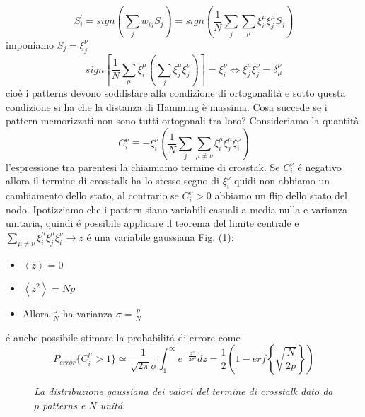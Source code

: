 \documentclass[12pt, a4paper]{book}
\theoremstyle{theorem}
\begin{document}
				\begin{equation}
					S_{i}^\prime = sign \left( \sum_{j}w_{ij} S_{j} \right)= sign \left( \frac{1}{N}\sum_{j} \sum_{\mu}\xi_{i}^{\mu}\xi_{j}^{\mu}S_{j} \right)
				\end{equation} %
				imponiamo $S_j = \xi_j^\nu$
				\begin{equation}
					sign\left[ \frac{1}{N}\sum_\mu \xi_i^\mu \left( \sum_j \xi_j^\mu \xi_j^\nu\right) \right] = \xi_i^\nu \Longleftrightarrow \xi_j^\mu \xi_j^\nu = \delta_\mu^\nu
				\end{equation} 
				cioè i patterns devono soddisfare alla condizione di ortogonalità e sotto questa condizione si ha che la distanza di Hamming è massima.
				Cosa succede se i pattern memorizzati non sono tutti ortogonali tra loro?
				Consideriamo la quantità
				\begin{equation}
					C_i^\nu \equiv -\xi^\nu_i \left( \frac{1}{N} \sum_j \sum_{\mu \neq \nu} \xi_i^\mu \xi_j^\mu \xi_i^\nu \right)
				\end{equation}
				l'espressione tra parentesi la chiamiamo termine di crosstak. Se $C_i^\nu$ \'e negativo allora il termine di crosstalk ha lo stesso segno di $\xi^\nu_i$ quidi non abbiamo un cambiamento dello stato, al contrario se $C_i^\nu>0$ abbiamo un flip dello stato del nodo. Ipotizziamo che i pattern siano variabili casuali a media nulla e varianza  unitaria, quindi \'e possibile applicare il teorema del limite centrale e $\sum_{\mu \neq \nu} \xi_i^\mu \xi_j^\mu \xi_i^\nu \rightarrow z$ \'e una variabile gaussiana Fig. (\ref{figure::gauss_hopfield}):
				\begin{itemize}
					\item $\left \langle z \right \rangle =0$
					\item $\left \langle z^2 \right \rangle =Np$
					\item Allora $\frac{z}{N}$ ha varianza $\sigma = \frac{p}{N}$
				\end{itemize}
				\'e anche possibile stimare la probabilit\'a di errore come
				\begin{equation}
					P_{error}\{ C_i^\mu > 1\} \simeq \frac{1}{\sqrt{2 \pi} \sigma} \int_1^\infty e^{-\frac{z^2}{2\sigma^2}} dz = \frac{1}{2} \left( 1 - erf\left\{ \sqrt{\frac{N}{2p}}\right\} \right)
				\end{equation}
				\begin{figure}
					\centering
					\caption{\textit{La distribuzione gaussiana dei valori del termine di crosstalk dato da $p$ patterns e $N$ unit\'a.}}
					\label{figure::gauss_hopfield}
				\end{figure}
\end{document}
